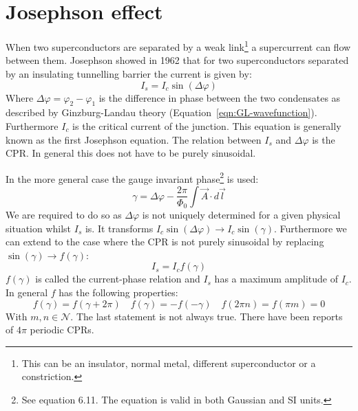 \section{Josephson effect}
\label{sec:josephson-effect}
When two superconductors are separated by a weak link\footnote{This can be an insulator, normal metal, different superconductor or a constriction.} a supercurrent can flow between them. Josephson showed in 1962 that for two superconductors separated by an insulating tunnelling barrier the current is given by\cite{tinkhamIntroductionSuperconductivity}:
\begin{equation}
	I_s = I_c \sin(\Delta \varphi)
	\label{eqn:1st-josephson-relation}
\end{equation}
Where $\Delta \varphi = \varphi_2 - \varphi_1$ is the difference in phase between the two condensates as described by Ginzburg-Landau theory (Equation~\ref{eqn:GL-wavefunction}). Furthermore $I_c$ is the critical current of the junction. This equation is generally known as the first Josephson equation. The relation between $I_s$ and $\Delta \varphi$ is the CPR. In general this does not have to be purely sinusoidal.\cite{golubovCurrentphaseRelationJosephson2004a}

In the more general case the gauge invariant phase\footnote{See  equation 6.11. The equation is valid in both Gaussian and SI units.} is used:
\begin{equation}
	\gamma = \Delta \varphi - \frac{2\pi}{\Phi_0}\int \vec{A} \cdot d\vec{l}
	\label{eqn:gauge-invariant-phase}
\end{equation}
We are required to do so as $\Delta \varphi$ is not uniquely determined for a given physical situation whilst $I_s$ is.\cite{tinkhamIntroductionSuperconductivity} It transforms $I_c \sin(\Delta \varphi) \to I_c \sin(\gamma)$. Furthermore we can extend to the case where the CPR is not purely sinusoidal by replacing $\sin(\gamma) \to f(\gamma)$:
\begin{equation}
	I_s = I_c f(\gamma)
\end{equation}
$f(\gamma)$ is called the current-phase relation and $I_s$ has a maximum amplitude of $I_c$. In general $f$ has the following properties\cite{golubovCurrentphaseRelationJosephson2004a}:
\begin{equation}
	f(\gamma) = f(\gamma + 2\pi) \quad f(\gamma) = -f(-\gamma) \quad f(2\pi n) = f(\pi m) = 0
\end{equation}
With $m,n \in \mathcal{N}$. The last statement is not always true. There have been reports of $4\pi$ periodic CPRs.\cite{endresCurrentPhaseRelation2023}

